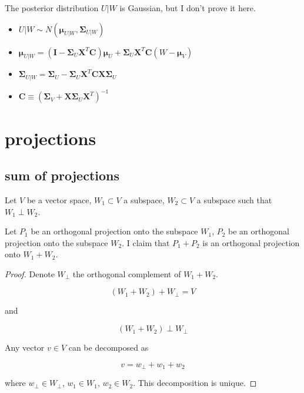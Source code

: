 \documentclass{article}
\begin{document}
\begin{appendices}
The posterior distribution $U|W$ is Gaussian, but I don't prove it here.

\begin{itemize}
    \item $U|W \sim N(\bm{\mu}_{U|W}, \bm{\Sigma}_{U|W})$
    \item $\bm{\mu}_{U|W} = (\bm{I} - \bm{\Sigma}_U \bm{X}^T \bm{C}) \bm{\mu}_U + \bm{\Sigma}_U \bm{X}^T \bm{C}(W - \bm{\mu}_V)$
    \item $\bm{\Sigma}_{U|W} =\bm{\Sigma}_U - \bm{\Sigma}_U \bm{X}^T \bm{C} \bm{X} \bm{\Sigma}_U$
    \item $\bm{C} \equiv (\bm{\Sigma}_V + \bm{X} \bm{\Sigma}_U \bm{X}^T)^{-1}$
\end{itemize}



\section{projections}

\subsection{sum of projections}

Let $V$ be a vector space, $W_1 \subset V$ a subspace, $W_2 \subset V$ a subspace such that $W_1 \perp W_2$.

Let $P_1$ be an orthogonal projection onto the subspace $W_1$, $P_2$ be an orthogonal projection onto the subspace $W_2$. I claim that $P_1 + P_2$ is an orthogonal projection onto $W_1 + W_2$.

\begin{proof}

Denote $W_{\perp}$ the orthogonal complement of $W_1+W_2$.

\begin{equation}
    (W_1 + W_2) + W_{\perp} = V
\end{equation}

and

\begin{equation}
    (W_1 + W_2) \perp W_{\perp}
\end{equation}

Any vector $v \in V$ can be decomposed as

\begin{equation}
    v = w_{\perp} + w_1 + w_2
\end{equation}

where $w_{\perp} \in W_{\perp}$, $w_1 \in W_1$, $w_2 \in W_2$. This decomposition is unique.


\end{proof}
\end{appendices}
\end{document}
